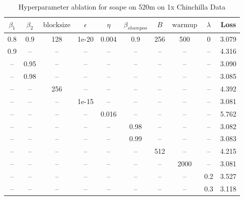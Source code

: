 \begin{table}[h!]
\centering
\caption{Hyperparameter ablation for soape on 520m on 1x Chinchilla Data}
\label{tab:ablation_soape_520m_on_1x_chinchilla_data}
\begin{tabular}{cccccccccc}
\toprule
$\beta_1$ & $\beta_2$ & $\mathrm{block size}$ & $\epsilon$ & $\eta$ & $\beta_{shampoo}$ & $B$ & $\mathrm{warmup}$ & $\lambda$ & Loss \\
\midrule
0.8 & 0.9 & 128 & 1e-20 & 0.004 & 0.9 & 256 & 500 & 0 & 3.079 \\
\midrule
0.9 & -- & -- & -- & -- & -- & -- & -- & -- & 4.316 \\
-- & 0.95 & -- & -- & -- & -- & -- & -- & -- & 3.090 \\
-- & 0.98 & -- & -- & -- & -- & -- & -- & -- & 3.085 \\
-- & -- & 256 & -- & -- & -- & -- & -- & -- & 4.392 \\
-- & -- & -- & 1e-15 & -- & -- & -- & -- & -- & 3.081 \\
-- & -- & -- & -- & 0.016 & -- & -- & -- & -- & 5.762 \\
-- & -- & -- & -- & -- & 0.98 & -- & -- & -- & 3.082 \\
-- & -- & -- & -- & -- & 0.99 & -- & -- & -- & 3.083 \\
-- & -- & -- & -- & -- & -- & 512 & -- & -- & 4.215 \\
-- & -- & -- & -- & -- & -- & -- & 2000 & -- & 3.081 \\
-- & -- & -- & -- & -- & -- & -- & -- & 0.2 & 3.527 \\
-- & -- & -- & -- & -- & -- & -- & -- & 0.3 & 3.118 \\
\bottomrule
\end{tabular}
\end{table}

